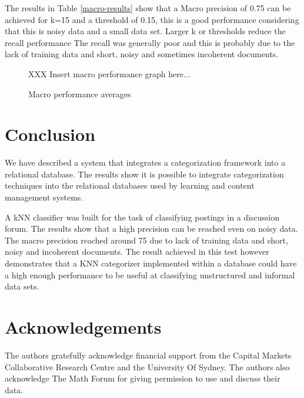 \documentclass[twocolumn]{article}
\begin{document}
The results in Table \ref{macro-results} show that a Macro precision of 0.75 can be achieved for k=15 
and a threshold of 0.15, this is a good performance considering that this is noisy data 
and a small data set. Larger k or thresholds reduce the recall performance The recall 
was generally poor and this is probably due to the lack of training data and short, 
noisy and sometimes incoherent documents.
 
\begin{figure}
XXX Insert macro performance graph here...
\caption{Macro performance averages}
\end{figure}
 

\section{Conclusion}

We have described a system that integrates a categorization framework into a 
relational database. The results show it is possible to integrate categorization 
techniques into the relational databases used by learning and content management 
systems.

A kNN classifier was built for the task of classifying postings in a discussion forum. 
The results show that a high precision can be reached even on  noisy data. The macro 
precision reached around 75%
due to lack of training data and short, noisy and incoherent documents. The result 
achieved in this test however demonstrates that a KNN categorizer implemented 
within a database could have a high enough performance to be useful at classifying 
unstructured and informal data sets. 

\section*{Acknowledgements}

The authors gratefully acknowledge financial support from the Capital Markets 
Collaborative Research Centre and the University Of Sydney. The authors also 
acknowledge The Math Forum for giving permission to use and discuss their data. 



\end{document}
